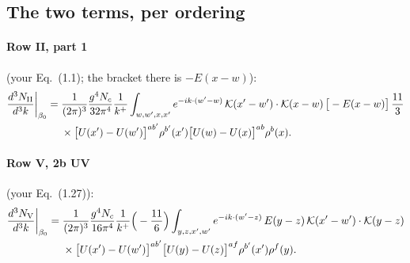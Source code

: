 \documentclass[10pt]{article}
\numberwithin{equation}{section}
\begin{document}
\subsection{The two terms, per ordering}
\paragraph{Row II, part 1} (your Eq.~(1.1); the bracket there is $-E(x-w)$):
\begin{align}
\frac{d^3N_{\rm II}}{d^3k}\bigg|_{\beta_0}={}&\frac{1}{(2\pi)^3}\frac{g^4N_c}{32\pi^4}\frac{1}{k^+}\int_{w,w',x,x'}e^{-ik\cdot(w'-w)}\,\mathcal K(x'-w')\cdot\mathcal K(x-w)\,\big[-E(x-w)\big]\,\frac{11}{3}\notag\\
&\times\big[U(x')-U(w')\big]^{ab'}\rho^{b'}(x')\big[U(w)-U(x)\big]^{ab}\rho^{b}(x).
\label{eq:II}
\end{align}
\paragraph{Row V, 2b UV} (your Eq.~(1.27)):
\begin{align}
\frac{d^3N_{\rm V}}{d^3k}\bigg|_{\beta_0}={}&\frac{1}{(2\pi)^3}\frac{g^4N_c}{16\pi^4}\frac{1}{k^+}\Big(-\frac{11}{6}\Big)\int_{y,z,x',w'}e^{-ik\cdot(w'-z)}\,E(y-z)\,\mathcal K(x'-w')\cdot\mathcal K(y-z)\notag\\
&\times\big[U(x')-U(w')\big]^{ab'}\big[U(y)-U(z)\big]^{af}\rho^{b'}(x')\rho^{f}(y).
\label{eq:V}
\end{align}
\end{document}
